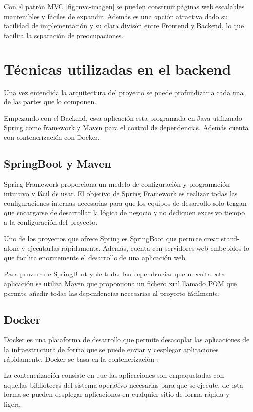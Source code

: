 Con el patrón MVC \ref{fig:mvc-imagen} se pueden construir páginas web escalables mantenibles y fáciles de expandir. Además es una opción atractiva dado su facilidad de implementación y su clara divisón entre Frontend y Backend, lo que facilita la separación de preocupaciones.

\section{Técnicas utilizadas en el backend}
Una vez entendida la arquitectura del proyecto se puede profundizar a cada una de las partes que lo componen.

Empezando con el Backend, esta aplicación esta programada en Java utilizando Spring como framework y Maven para el control de dependencias. Además cuenta con contenerización con Docker.

\subsection{SpringBoot y Maven}
Spring Framework proporciona un modelo de configuración y programación intuitivo y fácil de usar. El objetivo de Spring Framework\cite{spring-framework} es realizar todas las configuraciones internas necesarias para que los equipos de desarrollo solo tengan que encargarse de desarrollar la lógica de negocio y no dediquen excesivo tiempo a la configuración del proyecto.

Uno de los proyectos que ofrece Spring es SpringBoot\cite{spring-boot} que permite crear stand-alone y ejecutarlas rápidamente. Además, cuenta con servidores web embebidos lo que facilita enormemente el desarrollo de una aplicación web.

Para proveer de SpringBoot y de todas las dependencias que necesita esta aplicación se utiliza Maven que proporciona un fichero xml llamado POM que permite añadir todas las dependencias necesarias al proyecto fácilmente.

\subsection{Docker}
Docker \cite{docker} es una plataforma de desarrollo que permite desacoplar las aplicaciones de la infraestructura de forma que se puede enviar y desplegar aplicaciones rápidamente. Docker se basa en la contenerización \cite{contenerización}. 

La contenerización consiste en que las aplicaciones son empaquetadas con aquellas bibliotecas del sistema operativo necesarias para que se ejecute, de esta forma se pueden desplegar aplicaciones en cualquier sitio de forma rápida y ligera.


